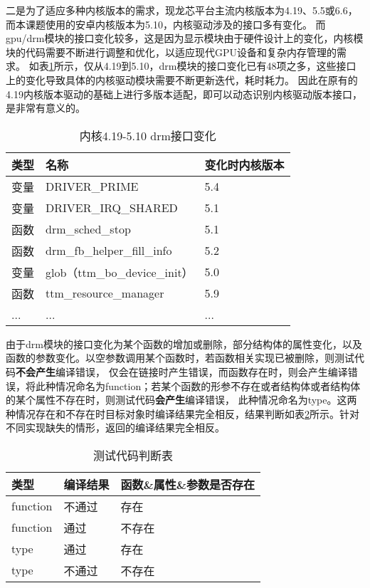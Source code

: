 二是为了适应多种内核版本的需求，现龙芯平台主流内核版本为4.19、5.5或6.6，而本课题使用的安卓内核版本为5.10，内核驱动涉及的接口多有变化。
而gpu/drm模块的接口变化较多，这是因为显示模块由于硬件设计上的变化，内核模块的代码需要不断进行调整和优化，以适应现代GPU设备和复杂内存管理的需求。
如表\ref{tab:内核4.19-5.10 drm接口变化}所示，仅从4.19到5.10，drm模块的接口变化已有48项之多，这些接口上的变化导致具体的内核驱动模块需要不断更新迭代，耗时耗力。
因此在原有的4.19内核版本驱动的基础上进行多版本适配，即可以动态识别内核驱动版本接口，是非常有意义的。

\begin{table}[h]
  \centering
  \caption{内核4.19-5.10 drm接口变化}
  \label{tab:内核4.19-5.10 drm接口变化}
  \begin{tabular}{lll}
    \toprule
    类型   &   名称  &变化时内核版本  \\
    \midrule
    变量 & DRIVER\_PRIME & 5.4 \\
    变量 & DRIVER\_IRQ\_SHARED & 5.1 \\
    函数 & drm\_sched\_stop & 5.1 \\
    函数 & drm\_fb\_helper\_fill\_info & 5.2 \\
    变量 & glob（ttm\_bo\_device\_init） & 5.0 \\
    函数 & ttm\_resource\_manager & 5.9 \\
    ... & ... & ... \\
    \bottomrule
  \end{tabular}
\end{table}

由于drm模块的接口变化为某个函数的增加或删除，部分结构体的属性变化，以及函数的参数变化。以空参数调用某个函数时，若函数相关实现已被删除，则测试代码\textbf{不会产生}编译错误，
仅会在链接时产生错误，而函数存在时，则会产生编译错误，将此种情况命名为function；若某个函数的形参不存在或者结构体或者结构体的某个属性不存在时，则测试代码\textbf{会产生}编译错误，
此种情况命名为type。这两种情况存在和不存在时目标对象时编译结果完全相反，结果判断如表\ref{tab:测试代码判断表}所示。针对不同实现缺失的情形，返回的编译结果完全相反。

\begin{table}[h]
  \centering
  \caption{测试代码判断表}
  \label{tab:测试代码判断表}
  \begin{tabular}{lll}
    \toprule
    类型   &   编译结果 & 函数\&属性\&参数是否存在    \\
    \midrule
    function & 不通过 & 存在 \\
    function & 通过 & 不存在 \\
    type & 通过 & 存在 \\
    type & 不通过 & 不存在 \\
    \bottomrule
  \end{tabular}
\end{table}


